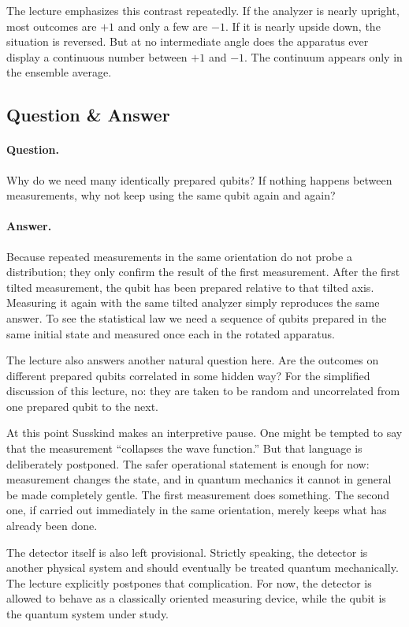 The lecture emphasizes this contrast repeatedly. If the analyzer is nearly upright, most outcomes are \(+1\) and only a few are \(-1\). If it is nearly upside down, the situation is reversed. But at no intermediate angle does the apparatus ever display a continuous number between \(+1\) and \(-1\). The continuum appears only in the ensemble average.

\subsection{Question \& Answer}

\paragraph{Question.} Why do we need many identically prepared qubits? If nothing happens between measurements, why not keep using the same qubit again and again?

\paragraph{Answer.} Because repeated measurements in the same orientation do not probe a distribution; they only confirm the result of the first measurement. After the first tilted measurement, the qubit has been prepared relative to that tilted axis. Measuring it again with the same tilted analyzer simply reproduces the same answer. To see the statistical law we need a sequence of qubits prepared in the same initial state and measured once each in the rotated apparatus.

The lecture also answers another natural question here. Are the outcomes on different prepared qubits correlated in some hidden way? For the simplified discussion of this lecture, no: they are taken to be random and uncorrelated from one prepared qubit to the next.

At this point Susskind makes an interpretive pause. One might be tempted to say that the measurement ``collapses the wave function.'' But that language is deliberately postponed. The safer operational statement is enough for now: measurement changes the state, and in quantum mechanics it cannot in general be made completely gentle. The first measurement does something. The second one, if carried out immediately in the same orientation, merely keeps what has already been done.

The detector itself is also left provisional. Strictly speaking, the detector is another physical system and should eventually be treated quantum mechanically. The lecture explicitly postpones that complication. For now, the detector is allowed to behave as a classically oriented measuring device, while the qubit is the quantum system under study.

